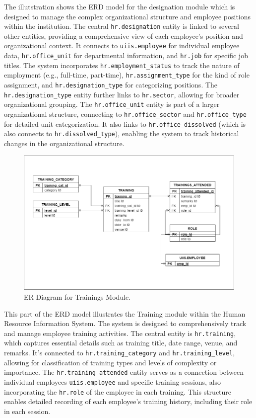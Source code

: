     The illutstration shows the ERD model for the designation module which is designed to manage the complex organizational structure and employee positions within the institution. The central \texttt{hr.designation} entity is linked to several other entities, providing a comprehensive view of each employee's position and organizational context. It connects to \texttt{uiis.employee} for individual employee data, \texttt{hr.office\_unit} for departmental information, and \texttt{hr.job} for specific job titles. The system incorporates \texttt{hr.employment\_status} to track the nature of employment (e.g., full-time, part-time), \texttt{hr.assignment\_type} for the kind of role assignment, and \texttt{hr.designation\_type} for categorizing positions. The \texttt{hr.designation\_type} entity further links to \texttt{hr.sector}, allowing for broader organizational grouping. The \texttt{hr.office\_unit} entity is part of a larger organizational structure, connecting to \texttt{hr.office\_sector} and \texttt{hr.office\_type} for detailed unit categorization. It also links to \texttt{hr.office\_dissolved} (which is also connects to \texttt{hr.dissolved\_type}), enabling the system to track historical changes in the organizational structure.

    \begin{figure}[H]
        \centering
        \includegraphics[width=1\linewidth]{figures/images/diagrams/erd/erd-core-trainings.png}
        \caption{ER Diagram for Trainings Module.}
        \label{fig:erd-core-trainings}
    \end{figure}

    This part of the ERD model illustrates the Training module within the Human Resource Information System. The system is designed to comprehensively track and manage employee training activities. The central entity is \texttt{hr.training}, which captures essential details such as training title, date range, venue, and remarks. It's connected to \texttt{hr.training\_category} and \texttt{hr.training\_level}, allowing for classification of training types and levels of complexity or importance. The \texttt{hr.training\_attended} entity serves as a connection between individual employees \texttt{uiis.employee} and specific training sessions, also incorporating the \texttt{hr.role} of the employee in each training. This structure enables detailed recording of each employee's training history, including their role in each session.

